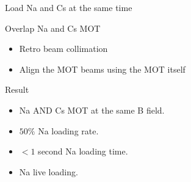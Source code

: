 \documentclass{beamer}
\title[Na \textbf{and} Cs update]{\only<1>{NaCs update}\only<2->{Na {\huge AND} Cs update}}
\date{November 4, 2016}
\author{Yichao Yu}
\institute{Ni Group/Harvard}
\begin{document}
\begin{frame}{}
  \titlepage
\end{frame}



\begin{frame}{Load Na and Cs at the same time}
  \begin{block}{Overlap Na and Cs MOT}
    \begin{itemize}
    \item<2-> Retro beam collimation\\
    \item<4-> Align the MOT beams using the MOT itself
    \end{itemize}
  \end{block}
   {
    \begin{block}{Result}
      \begin{itemize}
      \item<6-> Na AND Cs MOT at the same B field.
      \item<7-> $50\%$ Na loading rate.
      \item<8-> $<1$ second Na loading time.
      \item<9-> Na live loading.
      \end{itemize}
    \end{block}
  }
\end{frame}
\end{document}

